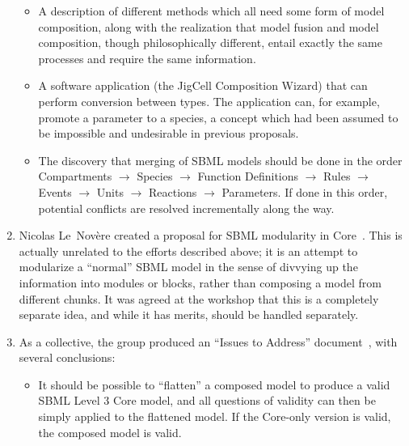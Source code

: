 \begin{enumerate}
    \begin{itemize}

    \item A description of different methods which all need some form of
      model composition, along with the realization that model fusion
      and model composition, though philosophically different, entail
      exactly the same processes and require the same information.

    \item A software application (the JigCell Composition Wizard) that
      can perform conversion between types.  The application can, for
      example, promote a parameter to a species, a concept which had
      been assumed to be impossible and undesirable in previous
      proposals.  

    \item The discovery that merging of SBML models should be done in
      the order Compartments $\rightarrow$ Species  $\rightarrow$
      Function Definitions  $\rightarrow$ Rules  $\rightarrow$ Events
      $\rightarrow$ Units  $\rightarrow$ Reactions  $\rightarrow$
      Parameters.  If done in this order, potential conflicts are
      resolved incrementally along the way.

    \end{itemize}

  \item Nicolas Le~Nov\`{e}re created a proposal for SBML modularity in
    Core~\cite{}.  This is actually unrelated to the efforts described
    above; it is an attempt to modularize a ``normal'' SBML model in the
    sense of divvying up the information into modules or blocks, rather
    than composing a model from different chunks.  It was agreed at the
    workshop that this is a completely separate idea, and while it has
    merits, should be handled separately.

  \item As a collective, the group produced an ``Issues to Address''
    document~\cite{}, with several conclusions:


    \begin{itemize}

    \item It should be possible to ``flatten'' a composed model to
      produce a valid SBML Level 3 Core model, and all questions of
      validity can then be simply applied to the flattened model.  If
      the Core-only version is valid, the composed model is valid.


\end{itemize}
\end{enumerate}
